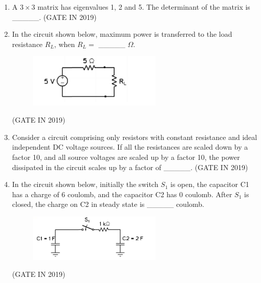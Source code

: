 \documentclass[journal]{IEEEtran}
\begin{document}
\begin{enumerate}
\item A $3 \times 3$ matrix has eigenvalues 1, 2 and 5. The determinant of the matrix is \_\_\_\_\_.
\hfill(GATE IN 2019)
\item In the circuit shown below, maximum power is transferred to the load resistance $R_L$, when $R_L = $ \_\_\_\_\_ $\Omega$.
\begin{figure}[H]
    \centering
    \includegraphics[width=0.6\textwidth]{6.png}
    \caption{}
    \label{fig:fig6}
\end{figure}
\hfill(GATE IN 2019)
\item Consider a circuit comprising only resistors with constant resistance and ideal independent DC voltage sources. If all the resistances are scaled down by a factor 10, and all source voltages are scaled up by a factor 10, the power dissipated in the circuit scales up by a factor of \_\_\_\_\_.
\hfill(GATE IN 2019)
\item In the circuit shown below, initially the switch $S_1$ is open, the capacitor C1 has a charge of 6 coulomb, and the capacitor C2 has 0 coulomb. After $S_1$ is closed, the charge on C2 in steady state is \_\_\_\_\_ coulomb.
\begin{figure}[H]
    \centering
    \includegraphics[width=0.6\textwidth]{7.png}
    \caption{}
    \label{fig:fig7}
\end{figure}
\hfill(GATE IN 2019)


\end{enumerate}
\end{document}
